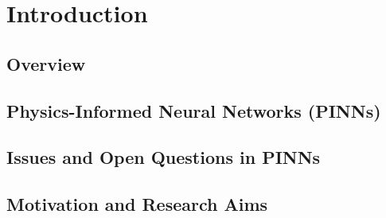\chapter{Introduction}

\section{Overview}\label{sec:overview}


\section{Physics-Informed Neural Networks (PINNs)}\label{sec:pinn-review}


\section{Issues and Open Questions in PINNs}\label{sec:pinn-issues}


\section{Motivation and Research Aims}\label{sec:aims}

